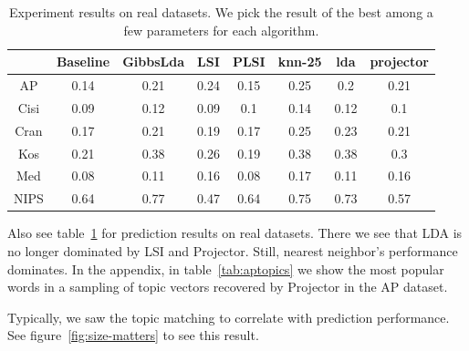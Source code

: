 \begin{table}[ht]
\begin{tabular}{|c|c|c|c|c|c|c|c|}
\hline 
 &Baseline &GibbsLda &LSI &PLSI &knn-25 &lda &projector \\
 \hline 
AP &0.14 &0.21 &0.24 &0.15 &0.25 &0.2 &0.21 \\
 \hline 
Cisi &0.09 &0.12 &0.09 &0.1 &0.14 &0.12 &0.1 \\
 \hline 
Cran &0.17 &0.21 &0.19 &0.17 &0.25 &0.23 &0.21 \\
 \hline 
Kos &0.21 &0.38 &0.26 &0.19 &0.38 &0.38 &0.3 \\
 \hline 
Med &0.08 &0.11 &0.16 &0.08 &0.17 &0.11 &0.16 \\
 \hline 
NIPS &0.64 &0.77 &0.47 &0.64 &0.75 &0.73 &0.57 \\
 \hline 

\end{tabular}
\caption{Experiment results on real datasets. We pick the result of the best among a few parameters for each algorithm. }
\label{tab:real}
\end{table}


Also see table~\ref{tab:real} for prediction results on real datasets.  There we see that
LDA is no longer dominated by LSI and Projector.  Still,  nearest neighbor's performance
dominates.  In the appendix, in table~\ref{tab:aptopics} we show the most popular
words in a sampling of topic vectors recovered by Projector in the AP dataset.

Typically, we saw the topic matching to correlate with prediction performance.
See figure~\ref{fig:size-matters} to see this result. 
